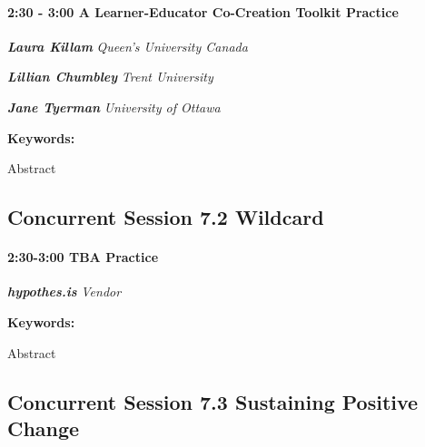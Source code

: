 \documentclass[
]{book}
\begin{document}
\begin{session}
\hypertarget{a-learner-educator-co-creation-toolkit-practice}{%
\paragraph*{\texorpdfstring{2:30 - 3:00 \textbar{} \textbf{A
Learner-Educator Co-Creation Toolkit} \textbar{}
Practice}{2:30 - 3:00 \textbar{} A Learner-Educator Co-Creation Toolkit \textbar{} Practice}}\label{a-learner-educator-co-creation-toolkit-practice}}

\textbf{\emph{Laura Killam}} \textbar{} \emph{Queen's University Canada}

\textbf{\emph{Lillian Chumbley}} \textbar{} \emph{Trent University }

\textbf{\emph{Jane Tyerman}} \textbar{} \emph{University of Ottawa}

\textbf{Keywords:}

Abstract
\end{session}

\hypertarget{concurrent-session-7.2-wildcard}{%
\subsection*{Concurrent Session 7.2 \textbar{} Wildcard}\label{concurrent-session-7.2-wildcard}}

\begin{vendor}
\hypertarget{tba-practice}{%
\paragraph*{\texorpdfstring{2:30-3:00 \textbar{} \textbf{TBA} \textbar{}
Practice}{2:30-3:00 \textbar{} TBA \textbar{} Practice}}\label{tba-practice}}

\textbf{\emph{hypothes.is}} \textbar{} \emph{Vendor}

\textbf{Keywords:}

Abstract
\end{vendor}

\hypertarget{concurrent-session-7.3-sustaining-positive-change}{%
\subsection*{Concurrent Session 7.3 \textbar{} Sustaining Positive Change}\label{concurrent-session-7.3-sustaining-positive-change}}
\end{document}
